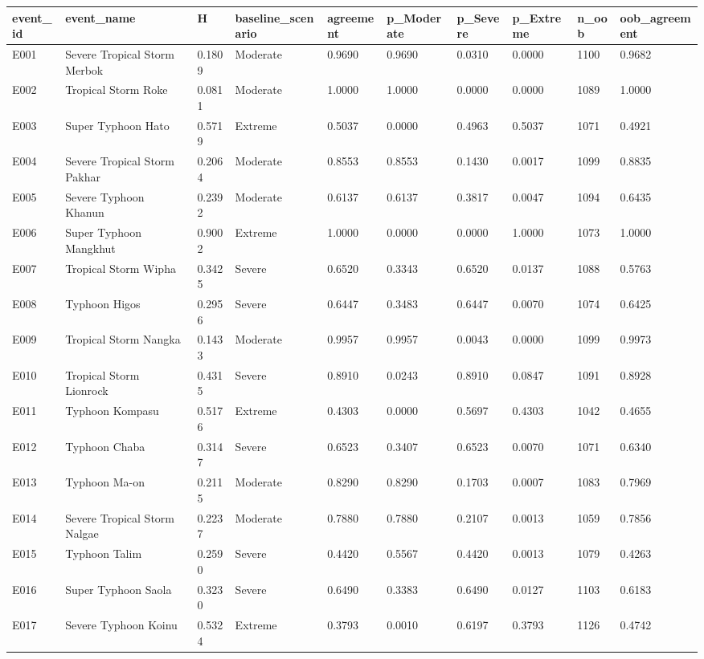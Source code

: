 \begin{tabular}{llllllllll}
\hline
event\_id & event\_name & H & baseline\_scenario & agreement & p\_Moderate & p\_Severe & p\_Extreme & n\_oob & oob\_agreement \\
\hline
E001 & Severe Tropical Storm Merbok & 0.1809 & Moderate & 0.9690 & 0.9690 & 0.0310 & 0.0000 & 1100 & 0.9682 \\
E002 & Tropical Storm Roke & 0.0811 & Moderate & 1.0000 & 1.0000 & 0.0000 & 0.0000 & 1089 & 1.0000 \\
E003 & Super Typhoon Hato & 0.5719 & Extreme & 0.5037 & 0.0000 & 0.4963 & 0.5037 & 1071 & 0.4921 \\
E004 & Severe Tropical Storm Pakhar & 0.2064 & Moderate & 0.8553 & 0.8553 & 0.1430 & 0.0017 & 1099 & 0.8835 \\
E005 & Severe Typhoon Khanun & 0.2392 & Moderate & 0.6137 & 0.6137 & 0.3817 & 0.0047 & 1094 & 0.6435 \\
E006 & Super Typhoon Mangkhut & 0.9002 & Extreme & 1.0000 & 0.0000 & 0.0000 & 1.0000 & 1073 & 1.0000 \\
E007 & Tropical Storm Wipha & 0.3425 & Severe & 0.6520 & 0.3343 & 0.6520 & 0.0137 & 1088 & 0.5763 \\
E008 & Typhoon Higos & 0.2956 & Severe & 0.6447 & 0.3483 & 0.6447 & 0.0070 & 1074 & 0.6425 \\
E009 & Tropical Storm Nangka & 0.1433 & Moderate & 0.9957 & 0.9957 & 0.0043 & 0.0000 & 1099 & 0.9973 \\
E010 & Tropical Storm Lionrock & 0.4315 & Severe & 0.8910 & 0.0243 & 0.8910 & 0.0847 & 1091 & 0.8928 \\
E011 & Typhoon Kompasu & 0.5176 & Extreme & 0.4303 & 0.0000 & 0.5697 & 0.4303 & 1042 & 0.4655 \\
E012 & Typhoon Chaba & 0.3147 & Severe & 0.6523 & 0.3407 & 0.6523 & 0.0070 & 1071 & 0.6340 \\
E013 & Typhoon Ma-on & 0.2115 & Moderate & 0.8290 & 0.8290 & 0.1703 & 0.0007 & 1083 & 0.7969 \\
E014 & Severe Tropical Storm Nalgae & 0.2237 & Moderate & 0.7880 & 0.7880 & 0.2107 & 0.0013 & 1059 & 0.7856 \\
E015 & Typhoon Talim & 0.2590 & Severe & 0.4420 & 0.5567 & 0.4420 & 0.0013 & 1079 & 0.4263 \\
E016 & Super Typhoon Saola & 0.3230 & Severe & 0.6490 & 0.3383 & 0.6490 & 0.0127 & 1103 & 0.6183 \\
E017 & Severe Typhoon Koinu & 0.5324 & Extreme & 0.3793 & 0.0010 & 0.6197 & 0.3793 & 1126 & 0.4742 \\

\end{tabular}
